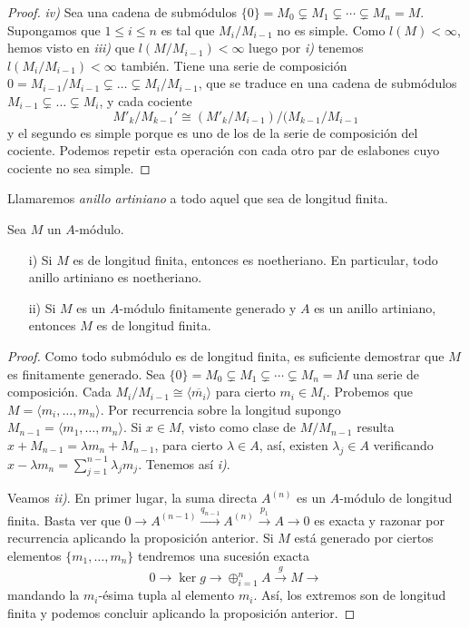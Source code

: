 \documentclass[../main.tex]{subfiles}
\begin{document}
\begin{proof}
\textit{iv)} Sea una cadena de submódulos $\{0\}=M_0\subsetneq M_1\subsetneq\cdots\subsetneq M_n=M$. Supongamos que $1 \leq i \leq n$ es tal que $M_i/M_{i-1}$ no es simple. Como $l(M) < \infty$, hemos visto en \textit{iii)} que $l(M/M_{i-1})< \infty$ luego por \textit{i)} tenemos $l(M_i/M_{i-1})< \infty$ también.
Tiene una serie de composición $0 = M_{i-1}/M_{i-1} \subsetneq \dots \subsetneq M_i/M_{i-1}$, que se traduce en una cadena de submódulos $M_{i-1} \subsetneq \dots \subsetneq M_i$, y cada cociente
$$M'_k/M_{k-1}' \cong (M'_k / M_{i-1}) / (M_{k-1}/M_{i-1}$$
y el segundo es simple porque es uno de los de la serie de composición del cociente. Podemos repetir esta operación con cada otro par de eslabones cuyo cociente no sea simple. 

\end{proof}

\begin{definition}
Llamaremos \textit{anillo artiniano} a todo aquel que sea de longitud finita.
\end{definition}

\begin{corollary}Sea $M$ un $A$-módulo.
\begin{itemize}
    \item[i)] Si $M$ es de longitud finita, entonces es noetheriano. En particular, todo anillo artiniano es noetheriano.
    \item[ii)] Si $M$ es un $A$-módulo finitamente generado y $A$ es un anillo artiniano, entonces $M$ es de longitud finita.
\end{itemize}
\end{corollary}
\begin{proof}
Como todo submódulo es de longitud finita, es suficiente demostrar que $M$ es finitamente generado. Sea $\{0\}=M_0\subsetneq M_1\subsetneq\cdots\subsetneq M_n=M$ una serie de composición. Cada $M_i/M_{i-1}\cong \langle\overline{m_i}\rangle$ para cierto $m_i\in M_i.$ Probemos que $M=\langle m_i,\dots,m_n\rangle.$ Por recurrencia sobre la longitud supongo $M_{n-1}=\langle m_1,\dots,m_n\rangle.$ Si $x\in M$, visto como clase de $M/M_{n-1}$ resulta $x+M_{n-1}=\lambda m_n+ M_{n-1}$, para cierto $\lambda\in A$, así, existen $\lambda_j\in A$ verificando $x-\lambda m_n=\sum_{j=1}^{n-1}\lambda_j m_j.$ Tenemos así \textit{i)}.

Veamos \textit{ii)}. En primer lugar, la suma directa $A^{(n)}$ es un $A$-módulo de longitud finita. Basta ver que $0\rightarrow A^{(n-1)}\overset{q_{n-1}}{\rightarrow}A^{(n)}\overset{p_1}{\rightarrow}A\rightarrow 0$ es exacta y razonar por recurrencia aplicando la proposición anterior. Si $M$ está generado por ciertos elementos $\{m_1,\dots,m_n\}$ tendremos una sucesión exacta
$$0\rightarrow\ker g\rightarrow\oplus_{i=1}^n A\overset{g}{\rightarrow}M\rightarrow$$
mandando la $m_i$-ésima tupla al elemento $m_i.$ Así, los extremos son de longitud finita y podemos concluir aplicando la proposición anterior.
\end{proof}
\end{document}
